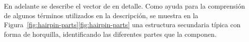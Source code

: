 En adelante se describe el vector de  en detalle.
Como ayuda para la comprensión de algunos términos utilizados en la
descripción, se muestra en la
\iflatexml{}Figura~\ref{fig:hairpin-parts}\else\autoref{fig:hairpin-parts}\fi{}
una estructura secundaria típica con forma de horquilla, identificando
las diferentes partes que la componen.
